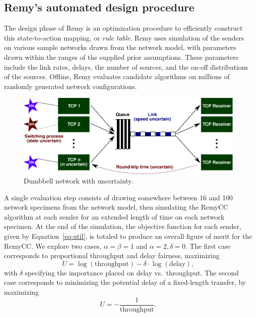 \subsection{Remy's automated design procedure}

The design phase of Remy is an optimization procedure to efficiently
construct this state-to-action mapping, or \emph{rule table}.  Remy uses simulation of the senders on
various sample networks drawn from the network model, with
parameters drawn within the ranges of the supplied prior
assumptions. These parameters include the link rates, delays, the
number of sources, and the on-off distributions of the
sources. Offline, Remy
evaluates candidate algorithms on
millions of randomly generated network configurations.


\begin{figure}
\vspace{\baselineskip}
\includegraphics[width=\columnwidth]{dumbbell.pdf}
\caption{Dumbbell network with uncertainty.}
\label{fig:dumbbell}

\end{figure}

A single evaluation step consists of drawing somewhere between 16 and
100 network specimens from the network model, then simulating the
RemyCC algorithm at each sender for an extended length of time on each
network specimen. At the end of the simulation, the objective function
for each sender, given by Equation~\ref{eq:util}, is totaled to
produce an overall figure of merit for the RemyCC. We explore two
cases, $\alpha = \beta = 1$ and $\alpha=2, \delta = 0$. The first case
corresponds to proportional throughput and delay fairness,
maximizing $$U = \log (\mbox{throughput}) - \delta \cdot \log
(\mbox{delay}),$$ with $\delta$ specifying the importance placed on
delay vs.~throughput. The second case corresponds to minimizing the
potential delay of a fixed-length transfer, by maximizing $$U =
-\frac{1}{\mbox{throughput}}.$$

